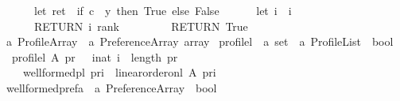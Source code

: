 \begin{isabellebody}
\ \ \ \ \ \ let\ ret\ {\isacharequal}{\kern0pt}\ {\isacharparenleft}{\kern0pt}if\ {\isacharparenleft}{\kern0pt}c\ {\isacharequal}{\kern0pt}\ y{\isacharparenright}{\kern0pt}\ then\ True\ else\ False{\isacharparenright}{\kern0pt}{\isacharsemicolon}{\kern0pt}\isanewline
\ \ \ \ \ \ let\ i\ {\isacharequal}{\kern0pt}\ i\ {\isacharplus}{\kern0pt}\ {}{\isacharsemicolon}{\kern0pt}\isanewline
\ \ \ \ \ \ RETURN\ {\isacharparenleft}{\kern0pt}i{\isacharcomma}{\kern0pt}\ rank{\isacharparenright}{\kern0pt}\isanewline
\ \ \ \ {\isacharbraceright}{\kern0pt}{\isacharparenright}{\kern0pt}{\isacharparenleft}{\kern0pt}{}{\isacharcomma}{\kern0pt}{}{\isacharparenright}{\kern0pt}{\isacharsemicolon}{\kern0pt}\isanewline
\ \ \ \ RETURN\ {\isacharparenleft}{\kern0pt}True{\isacharparenright}{\kern0pt}\isanewline
\ \ {\isacharbraceright}{\kern0pt}{\isachardoublequoteclose}\isanewline
\isanewline
{}\isamarkupfalse%
\ {\isacharprime}{\kern0pt}a\ Profile{\isacharunderscore}{\kern0pt}Array\ {\isacharequal}{\kern0pt}\ {\isachardoublequoteopen}{\isacharparenleft}{\kern0pt}{\isacharprime}{\kern0pt}a\ Preference{\isacharunderscore}{\kern0pt}Array{\isacharparenright}{\kern0pt}\ array{\isachardoublequoteclose}\isanewline
\isanewline
{}\isamarkupfalse%
\ profile{\isacharunderscore}{\kern0pt}l\ {\isacharcolon}{\kern0pt}{\isacharcolon}{\kern0pt}\ {\isachardoublequoteopen}{\isacharprime}{\kern0pt}a\ set\ {\isasymRightarrow}\ {\isacharprime}{\kern0pt}a\ Profile{\isacharunderscore}{\kern0pt}List\ {\isasymRightarrow}\ bool{\isachardoublequoteclose}\ \isanewline
\ \ {\isachardoublequoteopen}profile{\isacharunderscore}{\kern0pt}l\ A\ pr{}\ {\isasymequiv}\ {\isacharparenleft}{\kern0pt}{\isasymforall}\ i{\isacharcolon}{\kern0pt}{\isacharcolon}{\kern0pt}nat{\isachardot}{\kern0pt}\ i\ {\isacharless}{\kern0pt}\ length\ pr{}\ {\isasymlongrightarrow}\ \isanewline
\ \ \ \ well{\isacharunderscore}{\kern0pt}formed{\isacharunderscore}{\kern0pt}pl\ {\isacharparenleft}{\kern0pt}pr{}{\isacharbang}{\kern0pt}i{\isacharparenright}{\kern0pt}\ {\isasymand}\ linear{\isacharunderscore}{\kern0pt}order{\isacharunderscore}{\kern0pt}on{\isacharunderscore}{\kern0pt}l\ A\ {\isacharparenleft}{\kern0pt}pr{}{\isacharbang}{\kern0pt}i{\isacharparenright}{\kern0pt}{\isacharparenright}{\kern0pt}{\isachardoublequoteclose}\isanewline
\isanewline
{}\isamarkupfalse%
\ well{\isacharunderscore}{\kern0pt}formed{\isacharunderscore}{\kern0pt}prefa\ {\isacharcolon}{\kern0pt}{\isacharcolon}{\kern0pt}\ {\isachardoublequoteopen}{\isacharprime}{\kern0pt}a\ Preference{\isacharunderscore}{\kern0pt}Array\ {\isasymRightarrow}\ bool{\isachardoublequoteclose}\ \isanewline

\end{isabellebody}
